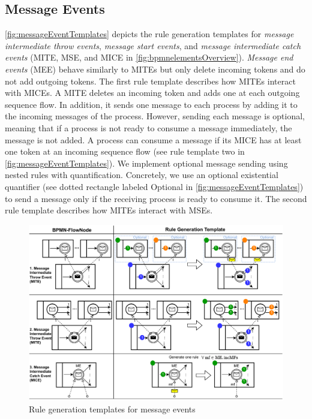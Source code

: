 \documentclass{lmcs} %
\theoremstyle{plain}\newtheorem{satz}[thm]{Satz} %
\begin{document}
\subsection{Message Events}
\autoref{fig:messageEventTemplates} depicts the rule generation templates for \textit{message intermediate throw events}, \textit{message start events}, and \textit{message intermediate catch events} (\textsf{MITE}, \textsf{MSE}, and \textsf{MICE} in \autoref{fig:bpmnelementsOverview}).
\textit{Message end events} (\textsf{MEE}) behave similarly to MITEs but only delete incoming tokens and do not add outgoing tokens.
The first rule template describes how MITEs interact with MICEs.
A MITE deletes an incoming token and adds one at each outgoing sequence flow.
In addition, it sends one message to each process by adding it to the incoming messages of the process.
However, sending each message is optional, meaning that if a process is not ready to consume a message immediately, the message is not added.
A process can consume a message if its MICE has at least one token at an incoming sequence flow (see rule template two in \autoref{fig:messageEventTemplates}).
We implement optional message sending using nested rules with quantification.
Concretely, we use an optional existential quantifier \cite{rensinkNestedQuantificationGraph2006} (see dotted rectangle labeled \textsf{Optional} in \autoref{fig:messageEventTemplates}) to send a message only if the receiving process is ready to consume it.
The second rule template describes how MITEs interact with MSEs.

\begin{figure}[ht]
    \centering
    \includegraphics[width=1\textwidth]{images/message_event_template.pdf}
    \caption{Rule generation templates for message events}
    \label{fig:messageEventTemplates}
\end{figure}
\end{document}
